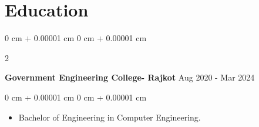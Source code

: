\documentclass[10pt, letterpaper]{article}
\newenvironment{highlights}{
    \begin{itemize}[
        topsep=0.10 cm,
        parsep=0.10 cm,
        partopsep=0pt,
        itemsep=0pt,
        leftmargin=0 cm + 10pt
    ]
}{
    \end{itemize}
} %
\newenvironment{onecolentry}{
    \begin{adjustwidth}{
        0 cm + 0.00001 cm
    }{
        0 cm + 0.00001 cm
    }
}{
    \end{adjustwidth}
} %
\newenvironment{twocolentry}[2][]{
    \onecolentry
    \def\secondColumn{#2}
    \setcolumnwidth{\fill, 4.5 cm}
    \begin{paracol}{2}
}{
    \switchcolumn \raggedleft \secondColumn
    \end{paracol}
    \endonecolentry
} %
\begin{document}
        \vspace{0.2 cm}


    \section{Education}
        \begin{twocolentry}{
            Aug 2020 - Mar 2024
        }
            \textbf{Government Engineering College- Rajkot}\end{twocolentry}

        \vspace{0.10 cm}
        \begin{onecolentry}
            \begin{highlights}
                \item Bachelor of Engineering in Computer Engineering.
            \end{highlights}
        \end{onecolentry}
\end{document}
